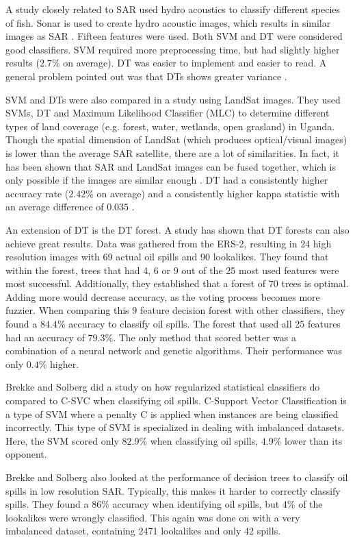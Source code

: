 A study closely related to SAR used hydro acoustics to classify different species of fish. Sonar is used to create hydro acoustic images, which results in similar images as SAR \cite{griffiths2003synthetic}. Fifteen features were used. Both SVM and DT were considered good classifiers. SVM required more preprocessing time, but had slightly higher results ($2.7$\% on average). DT was easier to implement and easier to read. A general problem pointed out was that DTs shows greater variance \cite{Robotham2011170}.

SVM and DTs were also compared in a study using LandSat images. They used SVMs, DT and Maximum Likelihood Classifier (MLC) to determine different types of land coverage (e.g. forest, water, wetlands, open grasland) in Uganda. Though the spatial dimension of LandSat (which produces optical/visual images) is lower than the average SAR satellite, there are a lot of similarities. In fact, it has been shown that SAR and LandSat images can be fused together, which is only possible if the images are similar enough \cite{dupas2000sar}. DT had a consistently higher accuracy rate ($2.42$\% on average) and a consistently higher kappa statistic with an average difference of $0.035$ \cite{Otukei2010S27}.

An extension of DT is the DT forest. A study \cite{Topouzelis201268} has shown that DT forests can also achieve great results. Data was gathered from the ERS-2, resulting in 24 high resolution images with 69 actual oil spills and 90 lookalikes. They found that within the forest, trees that had 4, 6 or 9 out of the 25 most used features were most successful. Additionally, they established that a forest of 70 trees is optimal. Adding more would decrease accuracy, as the voting process becomes more fuzzier. When comparing this 9 feature decision forest with other classifiers, they found a $84.4$\% accuracy to classify oil spills. The forest that used all 25 features had an accuracy of $79.3$\%. The only method that scored better was a combination of a neural network and genetic algorithms. Their performance was only $0.4$\% higher.

Brekke and Solberg \cite{brekke2008classifiers} did a study on how regularized statistical classifiers do compared to C-SVC when classifying oil spills. C-Support Vector Classification is a type of SVM where a penalty C is applied when instances are being classified incorrectly. This type of SVM is specialized in dealing with imbalanced datasets. Here, the SVM scored only $82.9$\% when classifying oil spills, $4.9$\% lower than its opponent.

Brekke and Solberg also looked at the performance of decision trees to classify oil spills in low resolution SAR. Typically, this makes it harder to correctly classify spills. They found a $86$\% accuracy when identifying oil spills, but $4$\% of the lookalikes were wrongly classified. This again was done on with a very imbalanced dataset, containing 2471 lookalikes and only 42 spills.

